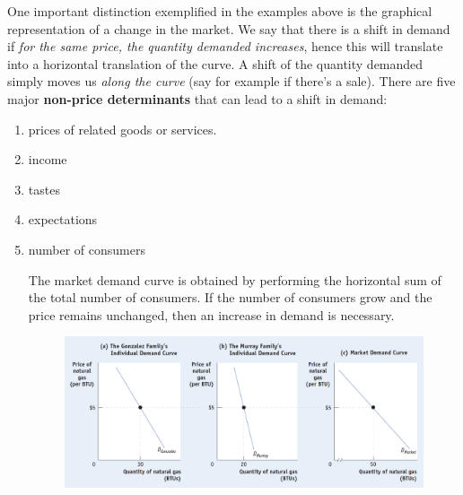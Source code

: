 \documentclass[english,course]{Notes}
\newcommand{\ita}[1]{\textit{#1}}
\begin{document}
		
	\par{One important distinction exemplified in the examples above is the graphical representation of a change in the market. We say that there is a shift in demand if \ita{for the same price, the quantity demanded increases}, hence this will translate into a horizontal translation of the curve. A shift of the quantity demanded simply moves us \ita{along the curve} (say for example if there's a sale). There are five major \textbf{non-price determinants} that can lead to a shift in demand:}
	\begin{enumerate}
	\item  prices of related goods or services. 
	
	
	\item income
	
	
	
	\item tastes
	\item expectations
	
	\item number of consumers
	
	
	\par{The market demand curve is obtained by performing the horizontal sum of the total number of consumers. If the number of consumers grow and the price remains unchanged, then an increase in demand is necessary.}
		\begin{figure}[ht]
\centering
\includegraphics[width=\textwidth]{demandIndividual}
\end{figure}

	\end{enumerate}
	
\end{document}

